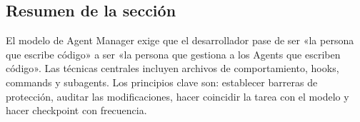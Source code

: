 \subsection{Resumen de la sección}

El modelo de Agent Manager exige que el desarrollador pase de ser «la persona que escribe código» a ser «la persona que gestiona a los Agents que escriben código». Las técnicas centrales incluyen archivos de comportamiento, hooks, commands y subagents. Los principios clave son: establecer barreras de protección, auditar las modificaciones, hacer coincidir la tarea con el modelo y hacer checkpoint con frecuencia.

